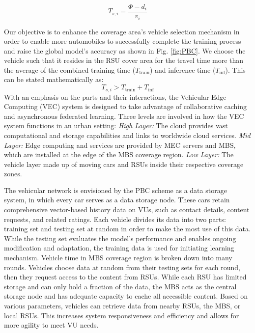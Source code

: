\documentclass[journal]{IEEEtran}
\begin{document}
\begin{equation}
T_{s,i} = \frac{\Phi - d_i}{v_i}
\end{equation}

Our objective is to enhance the coverage area's vehicle selection mechanism in order to enable more automobiles to successfully complete the training process and raise the global model's accuracy as shown in Fig. \ref{fig:PBC}. We choose the vehicle such that it resides in the RSU cover area for the travel time more than the average of the combined training time (\( T_{\text{train}} \)) and inference time (\( T_{\text{inf}} \)). This can be stated mathematically as:
\begin{equation} \label{eq:7}
T_{s,i} > T_{\text{train}} + T_{\text{inf}}
\end{equation}
With an emphasis on the parts and their interactions, the Vehicular Edge Computing (VEC) system is designed to take advantage of collaborative caching and asynchronous federated learning. Three levels are involved in how the VEC system functions in an urban setting: \textit{High Layer:} The cloud provides vast computational and storage capabilities and links to worldwide cloud services. \textit{Mid Layer:} Edge computing and services are provided by MEC servers and MBS, which are installed at the edge of the MBS coverage region. \textit{Low Layer:} The vehicle layer made up of moving cars and RSUs inside their respective coverage zones.


The vehicular network is envisioned by the PBC scheme as a data storage system, in which every car serves as a data storage node. These cars retain comprehensive vector-based history data on VUs, such as contact details, content requests, and related ratings.
Each vehicle divides its data into two parts: training set and testing set at random in order to make the most use of this data. While the testing set evaluates the model's performance and enables ongoing modification and adaptation, the training data is used for initiating learning mechanism. Vehicle time in MBS coverage region is broken down into many rounds. Vehicles choose data at random from their testing sets for each round, then they request access to the content from RSUs.
While each RSU has limited storage and can only hold a fraction of the data, the MBS acts as the central storage node and has adequate capacity to cache all accessible content. Based on various parameters, vehicles can retrieve data from nearby RSUs, the MBS, or local RSUs. This increases system responsiveness and efficiency and allows for more agility to meet VU needs.
\end{document}
